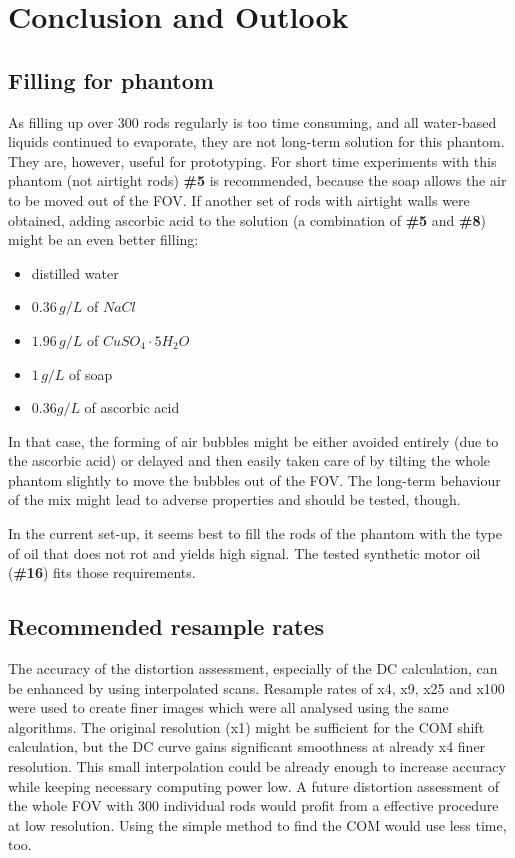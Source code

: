 
\chapter{Conclusion and Outlook}
\section{Filling for phantom}
\label{sec:filling}

As filling up over 300 rods regularly is too time consuming, and all water-based liquids continued to evaporate, they are not long-term solution for this phantom.
They are, however, useful for prototyping.
For short time experiments with this phantom (not airtight rods) \textbf{\#5} is recommended, because the soap allows the air to be moved out of the FOV.
If another set of rods with airtight walls were obtained, adding ascorbic acid to the solution (a combination of \textbf{\#5} and \textbf{\#8}) might be an even better filling:
\begin{itemize}
\item  distilled water
\item  $0.36 \, g/L$ of $NaCl$
\item  $1.96 \, g/L$ of $CuSO_4\cdot5H_2O$
\item  $1 \, g/L$ of soap
\item  $0.36 g/L$ of ascorbic acid
\end{itemize}
In that case, the forming of air bubbles might be either avoided entirely (due to the ascorbic acid) or delayed and then easily taken care of by tilting the whole phantom slightly to move the bubbles out of the FOV.
The long-term behaviour of the mix might lead to adverse properties and should be tested, though.

In the current set-up, it seems best to fill the rods of the phantom with the type of oil that does not rot and yields high signal.
The tested synthetic motor oil (\textbf{\#16}) fits those requirements.

\section{Recommended resample rates}

The accuracy of the distortion assessment, especially of the DC calculation, can be enhanced by using interpolated scans.
Resample rates of x4, x9, x25 and x100 were used to create finer images which were all analysed using the same algorithms.
The original resolution (x1) might be sufficient for the COM shift calculation, but the DC curve gains significant smoothness at already x4 finer resolution.
This small interpolation could be already enough to increase accuracy while keeping necessary computing power low.
A future distortion assessment of the whole FOV with 300 individual rods would profit from a effective procedure at low resolution.
Using the simple method to find the COM would use less time, too.


